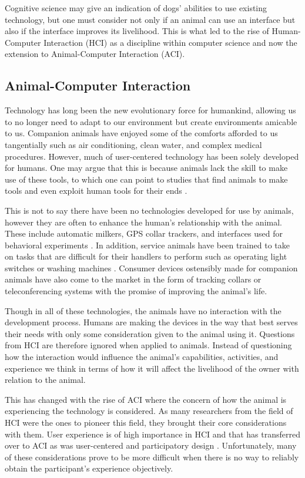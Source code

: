 \documentclass{sigchi}
\begin{document}
        Cognitive science may give an indication of dogs’ abilities to use existing technology, but one must consider not only if an animal can use an interface but also if the interface improves its livelihood. This is what led to the rise of Human-Computer Interaction (HCI) as a discipline within computer science and now the extension to Animal-Computer Interaction (ACI).

    \subsection{Animal-Computer Interaction}
        Technology has long been the new evolutionary force for humankind, allowing us to no longer need to adapt to our environment but create environments amicable to us. Companion animals have enjoyed some of the comforts afforded to us tangentially such as air conditioning, clean water, and complex medical procedures. However, much of user-centered technology has been solely developed for humans. One may argue that this is because animals lack the skill to make use of these tools, to which one can point to studies that find animals to make tools and even exploit human tools for their ends \cite{Hunt2004}.
        
        This is not to say there have been no technologies developed for use by animals, however they are often to enhance the human’s relationship with the animal. These include automatic milkers, GPS collar trackers, and interfaces used for behavioral experiments \cite{Epstein2000,Garton2001}. In addition, service animals have been trained to take on tasks that are difficult for their handlers to perform such as operating light switches or washing machines \cite{Mancini2017a}. Consumer devices ostensibly made for companion animals have also come to the market in the form of tracking collars or teleconferencing systems with the promise of improving the animal’s life.
        
        Though in all of these technologies, the animals have no interaction with the development process. Humans are making the devices in the way that best serves their needs with only some consideration given to the animal using it. Questions from HCI are therefore ignored when applied to animals. Instead of questioning how the interaction would influence the animal’s capabilities, activities, and experience we think in terms of how it will affect the livelihood of the owner with relation to the animal.
        
        This has changed with the rise of ACI where the concern of how the animal is experiencing the technology is considered. As many researchers from the field of HCI were the ones to pioneer this field, they brought their core considerations with them. User experience is of high importance in HCI and that has transferred over to ACI as was user-centered and participatory design \cite{Forlizzi2004,10.1007/978-3-642-15231-3_11,Muller1993}. Unfortunately, many of these considerations prove to be more difficult when there is no way to reliably obtain the participant’s experience objectively.
        
\end{document}

